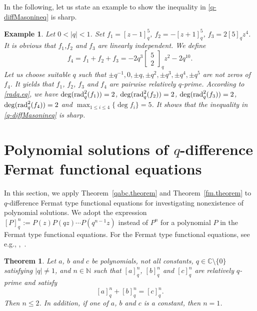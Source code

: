 \documentclass[a4paper,12pt]{article}
\newcommand{\C}{\mathbb{C}}
\newcommand{\N}{\mathbb{N}}
\newtheorem{theorem}[defin]{Theorem}
\newtheorem{exa}{Example}[section]
\newenvironment{example}{\begin{exa}\rm}{\end{exa}}
\numberwithin{equation}{section}
\begin{document}
\bigskip
In the following, let us state an example to show the inequality in \eqref{q-diffMasonineq} is sharp.
\begin{example}
Let $0<|q|<1$. Set $f_1=[z-1]_q^5$, $f_2=-[z+1]_q^5$, $f_3=2[5]_qz^4$. It is obvious that $f_1$,$f_2$ and $f_3$ are linearly independent. We define
    $$
    f_4=f_1+f_2+f_3=   -2q^3 \left[\begin{array}{cc}
    5\\
    2
    \end{array}
    \right]_qz^2-2q^{10}.
    $$
Let us choose suitable $q$ such that $\pm q^{-1}, 0,\pm q,\pm q^2,\pm q^3,\pm q^4, \pm q^5$ are not zeros of $f_4$. It yields that $f_1$, $f_2$, $f_3$ and $f_4$ are pairwise relatively $q$-prime.
According to \eqref{radq.eq}, we have $\deg({\rm rad}_q^2(f_1))=2$, $\deg({\rm rad}_q^2(f_2))=2$, $\deg({\rm rad}_q^2(f_3))=2$, $\deg({\rm rad}_q^2(f_4))=2$ and $\max_{1\le i\le4}\{\deg f_i\}=5$. It shows that the inequality in \eqref{q-diffMasonineq} is sharp.



\end{example}

\section{Polynomial solutions of $q$-difference Fermat functional equations}

In this section, we apply Theorem~\ref{qabc.theorem} and Theorem~\ref{fm.theorem} to $q$-difference Fermat type functional equations for investigating nonexistence of polynomial solutions.
We adopt the expression $[P]_q^n:=P(z)P(qz)\cdots P(q^{n-1}z)$ instead of $P^n$ for a polynomial $P$ in the Fermat type functional equations.  For the Fermat type functional equations, see e.g., \cite{GH2004},~\cite{GIK}.

\begin{theorem}\label{Equ3}
Let $a$, $b$ and $c$ be polynomials, not all constants, $q\in\C\setminus\{0\}$ satisfying $|q|\neq 1$, and $n\in\N$ such that $[a]_q^n$, $[b]_q^n$ and $[c]_q^n$ are relatively $q$-prime and satisfy
    \begin{equation}\label{abc.equ}
    [a]_q^n+[b]_q^n=[c]_q^n.
    \end{equation}
Then $n\leq 2$. In addition, if one of $a$, $b$ and $c$ is a constant, then $n=1$.
\end{theorem}
\end{document}
